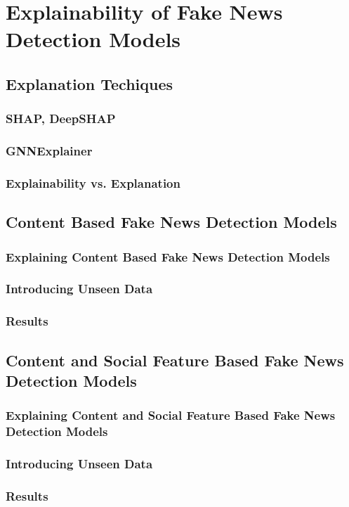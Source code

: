 

\chapter{Explainability of Fake News Detection Models}\label{chapter:explainability_of_fnd_models}

\section{Explanation Techiques}

\subsection{SHAP, DeepSHAP}

\subsection{GNNExplainer}

\subsection{Explainability vs. Explanation}

\section{Content Based Fake News Detection Models}

\subsection{Explaining Content Based Fake News Detection Models}

\subsection{Introducing Unseen Data}

\subsection{Results}

\section{Content and Social Feature Based Fake News Detection Models}

\subsection{Explaining Content and Social Feature Based Fake News Detection Models}

\subsection{Introducing Unseen Data}

\subsection{Results}